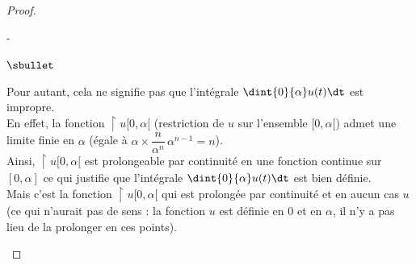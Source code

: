 \documentclass[11pt]{article}%
\begin{document}
\begin{proof}
\begin{remarkL}{.97}
\begin{noliste}{-}
\begin{noliste}{$\sbullet$}
        \item Pour autant, cela ne signifie pas que l'intégrale
          $\dint{0}{\alpha} u(t) \dt$ est impropre.\\
          En effet, la fonction $\restriction{u}{[0, \alpha[}$
          (restriction de $u$ sur l'ensemble $[0, \alpha[$) 
	  admet une limite finie en $\alpha$ (égale à $\alpha
            \times \dfrac{n}{\alpha^n} \, 
             \alpha^{n-1} = n$).\\[.1cm]
	  Ainsi, $\restriction{u}{[0, \alpha[}$ est prolongeable 
	  par
          continuité en une fonction continue sur $[0, \alpha]$ ce qui
          justifie que l'intégrale $\dint{0}{\alpha} u(t) \dt$ est bien
          définie. \\
          Mais c'est la fonction $\restriction{u}{[0, \alpha[}$ qui est
          prolongée par continuité et en aucun cas $u$ (ce qui
          n'aurait pas de sens : la fonction $u$ est définie en $0$
          et en $\alpha$, il n'y a pas lieu de la prolonger en ces
          points).


\end{noliste}
\end{noliste}
\end{remarkL}
\end{proof}
\end{document}
